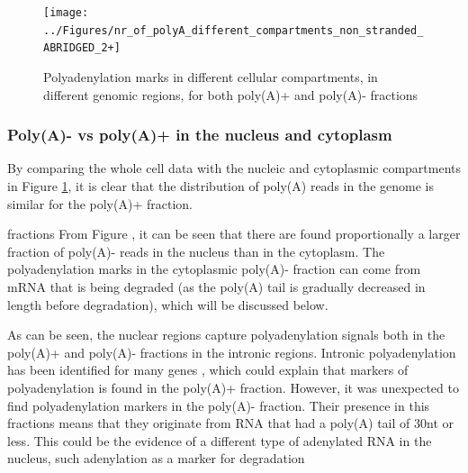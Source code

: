 \documentclass[a4paper]{article}
\begin{document}
\begin{figure}[h]
	\centering
		\texttt{[image: ../Figures/nr\_of\_polyA\_different\_compartments\_non\_stranded\_ABRIDGED\_2+]}
	\caption{Polyadenylation marks in different cellular compartments, in
	different genomic regions, for both poly(A)+ and poly(A)- fractions}
	\label{fig:region_counts}
\end{figure}
\subsubsection{Poly(A)- vs poly(A)+ in the nucleus and cytoplasm}
By comparing the whole cell data with the  nucleic and cytoplasmic compartments
in Figure \ref{fig:region_counts}, it is clear that the distribution of poly(A)
reads in the genome is similar for the poly(A)+ fraction.


fractions From Figure , it can be seen that there are found
proportionally a larger fraction of poly(A)- reads in the nucleus than in the
cytoplasm. The polyadenylation marks in the cytoplasmic poly(A)- fraction can
come from mRNA that is being degraded (as the poly(A) tail is gradually
decreased in length before degradation), which will be discussed below.


As can be seen, the nuclear regions capture polyadenylation signals both in the
poly(A)+ and poly(A)- fractions in the intronic regions. Intronic
polyadenylation has been identified for many genes \cite{tian_widespread_2007},
which could explain that markers of polyadenylation is found in the poly(A)+
fraction.  However, it was unexpected to find polyadenylation markers in the
poly(A)- fraction. Their presence in this fractions means that they originate
from RNA that had a poly(A) tail of 30nt or less. This could be the
evidence of a different type of adenylated RNA in the nucleus, such adenylation
as a marker for degradation \cite{slomovic_addition_2010}
\end{document}
